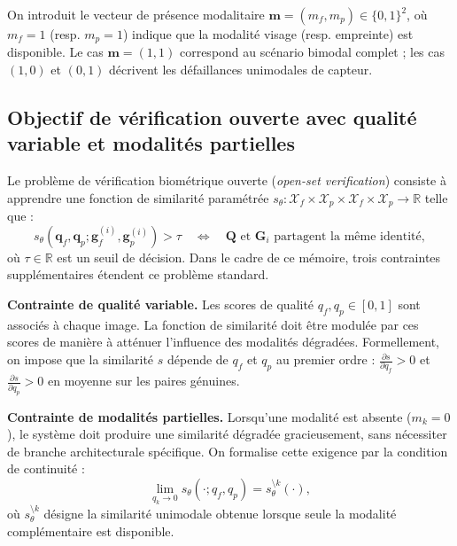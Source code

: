 \documentclass[12pt,a4paper]{report}
\begin{document}
On introduit le vecteur de pr\'{e}sence modalitaire $\mathbf{m} = (m_f, m_p) \in \{0, 1\}^2$, o\`{u} $m_f = 1$ (resp. $m_p = 1$) indique que la modalit\'{e} visage (resp. empreinte) est disponible. Le cas $\mathbf{m} = (1, 1)$ correspond au sc\'{e}nario bimodal complet ; les cas $(1, 0)$ et $(0, 1)$ d\'{e}crivent les d\'{e}faillances unimodales de capteur.

\subsection{Objectif de v\'{e}rification ouverte avec qualit\'{e} variable et modalit\'{e}s partielles}

Le probl\`{e}me de v\'{e}rification biom\'{e}trique ouverte (\emph{open-set verification}) consiste \`{a} apprendre une fonction de similarit\'{e} param\'{e}tr\'{e}e $s_\theta : \mathcal{X}_f \times \mathcal{X}_p \times \mathcal{X}_f \times \mathcal{X}_p \rightarrow \mathbb{R}$ telle que :
\begin{equation}
\label{eq:verification}
s_\theta(\mathbf{q}_f, \mathbf{q}_p; \mathbf{g}_f^{(i)}, \mathbf{g}_p^{(i)}) > \tau \quad \Leftrightarrow \quad \mathbf{Q} \text{ et } \mathbf{G}_i \text{ partagent la m\^{e}me identit\'{e}},
\end{equation}
o\`{u} $\tau \in \mathbb{R}$ est un seuil de d\'{e}cision. Dans le cadre de ce m\'{e}moire, trois contraintes suppl\'{e}mentaires \'{e}tendent ce probl\`{e}me standard.

\textbf{Contrainte de qualit\'{e} variable.} Les scores de qualit\'{e} $q_f, q_p \in [0, 1]$ sont associ\'{e}s \`{a} chaque image. La fonction de similarit\'{e} doit \^{e}tre modul\'{e}e par ces scores de mani\`{e}re \`{a} att\'{e}nuer l'influence des modalit\'{e}s d\'{e}grad\'{e}es. Formellement, on impose que la similarit\'{e} $s$ d\'{e}pende de $q_f$ et $q_p$ au premier ordre : $\frac{\partial s}{\partial q_f} > 0$ et $\frac{\partial s}{\partial q_p} > 0$ en moyenne sur les paires g\'{e}nuines.

\textbf{Contrainte de modalit\'{e}s partielles.} Lorsqu'une modalit\'{e} est absente ($m_k = 0$), le syst\`{e}me doit produire une similarit\'{e} d\'{e}grad\'{e}e gracieusement, sans n\'{e}cessiter de branche architecturale sp\'{e}cifique. On formalise cette exigence par la condition de continuit\'{e} :
\begin{equation}
\label{eq:continuite}
\lim_{q_k \rightarrow 0} s_\theta(\cdot; q_f, q_p) = s_\theta^{\setminus k}(\cdot),
\end{equation}
o\`{u} $s_\theta^{\setminus k}$ d\'{e}signe la similarit\'{e} unimodale obtenue lorsque seule la modalit\'{e} compl\'{e}mentaire est disponible.
\end{document}
